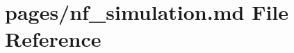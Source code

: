 \hypertarget{nf__simulation_8md}{}\section{pages/nf\+\_\+simulation.md File Reference}
\label{nf__simulation_8md}
